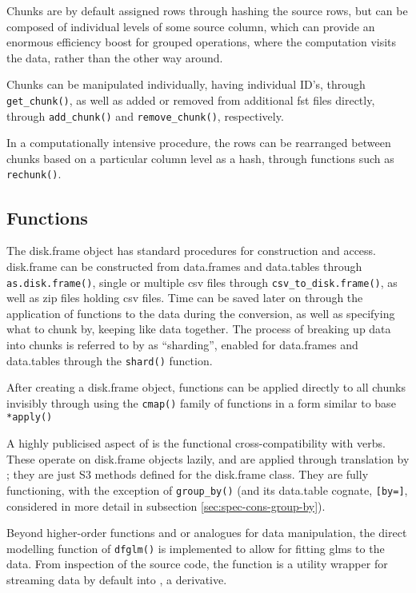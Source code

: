 Chunks are by default assigned rows through hashing the source rows, but
can be composed of individual levels of some source column, which can
provide an enormous efficiency boost for grouped operations, where the
computation visits the data, rather than the other way around.

Chunks can be manipulated individually, having individual ID's, through
\texttt{get_chunk()}, as well as added or
removed from additional fst files directly, through
\texttt{add_chunk()} and
\texttt{remove_chunk()}, respectively.

In a computationally intensive procedure, the rows can be rearranged
between chunks based on a particular column level as a hash, through
functions such as \texttt{rechunk()}.

\hypertarget{sec:functions}{%
    \subsection{Functions}\label{sec:functions}}

The disk.frame object has standard procedures for construction and
access. disk.frame can be constructed from data.frames and data.tables
through \texttt{as.disk.frame()}, single or
multiple csv files through
\texttt{csv_to_disk.frame()}, as well as zip
files holding csv files. Time can be saved later on through the
application of functions to the data during the conversion, as well as
specifying what to chunk by, keeping like data together. The process of
breaking up data into chunks is referred to by  as
``sharding'', enabled for data.frames and data.tables through the
\texttt{shard()} function.

After creating a disk.frame object, functions can be applied directly to
all chunks invisibly through using the
\texttt{cmap()} family of functions in a form
similar to base \R \texttt{*apply()}

A highly publicised aspect of  is the functional
cross-compatibility with  verbs. These operate on disk.frame
objects lazily, and are applied through translation by ; they
are just S3 methods defined for the disk.frame class. They are fully
functioning, with the exception of \texttt{group_by()} (and its
data.table cognate, \texttt{[by=]}, considered in more detail in
subsection \cref{sec:spec-cons-group-by}).

Beyond higher-order functions and  or  analogues for data
manipulation, the direct modelling function of
\texttt{dfglm()} is implemented to allow for
fitting glms to the data. From inspection of the source code, the
function is a utility wrapper for streaming  data by default
into , a  derivative.

